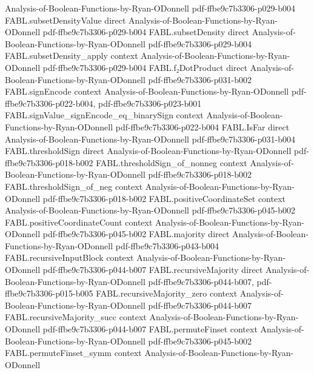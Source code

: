 \begin{theorem}
  {Analysis-of-Boolean-Functions-by-Ryan-ODonnell}
  {pdf-ffbe9c7b3306-p029-b004}
\proofstep
  {FABL.subsetDensityValue}
  {direct}
  {Analysis-of-Boolean-Functions-by-Ryan-ODonnell}
  {pdf-ffbe9c7b3306-p029-b004}
\proofstep
  {FABL.subsetDensity}
  {direct}
  {Analysis-of-Boolean-Functions-by-Ryan-ODonnell}
  {pdf-ffbe9c7b3306-p029-b004}
\proofstep
  {FABL.subsetDensity_apply}
  {context}
  {Analysis-of-Boolean-Functions-by-Ryan-ODonnell}
  {pdf-ffbe9c7b3306-p029-b004}
\proofstep
  {FABL.f₂DotProduct}
  {direct}
  {Analysis-of-Boolean-Functions-by-Ryan-ODonnell}
  {pdf-ffbe9c7b3306-p031-b002}
\proofstep
  {FABL.signEncode}
  {context}
  {Analysis-of-Boolean-Functions-by-Ryan-ODonnell}
  {pdf-ffbe9c7b3306-p022-b004,
    pdf-ffbe9c7b3306-p023-b001}
\proofstep
  {FABL.signValue_signEncode_eq_binarySign}
  {context}
  {Analysis-of-Boolean-Functions-by-Ryan-ODonnell}
  {pdf-ffbe9c7b3306-p022-b004}
\proofstep
  {FABL.IsFar}
  {direct}
  {Analysis-of-Boolean-Functions-by-Ryan-ODonnell}
  {pdf-ffbe9c7b3306-p031-b004}
\proofstep
  {FABL.thresholdSign}
  {direct}
  {Analysis-of-Boolean-Functions-by-Ryan-ODonnell}
  {pdf-ffbe9c7b3306-p018-b002}
\proofstep
  {FABL.thresholdSign_of_nonneg}
  {context}
  {Analysis-of-Boolean-Functions-by-Ryan-ODonnell}
  {pdf-ffbe9c7b3306-p018-b002}
\proofstep
  {FABL.thresholdSign_of_neg}
  {context}
  {Analysis-of-Boolean-Functions-by-Ryan-ODonnell}
  {pdf-ffbe9c7b3306-p018-b002}
\proofstep
  {FABL.positiveCoordinateSet}
  {context}
  {Analysis-of-Boolean-Functions-by-Ryan-ODonnell}
  {pdf-ffbe9c7b3306-p045-b002}
\proofstep
  {FABL.positiveCoordinateCount}
  {context}
  {Analysis-of-Boolean-Functions-by-Ryan-ODonnell}
  {pdf-ffbe9c7b3306-p045-b002}
\proofstep
  {FABL.majority}
  {direct}
  {Analysis-of-Boolean-Functions-by-Ryan-ODonnell}
  {pdf-ffbe9c7b3306-p043-b004}
\proofstep
  {FABL.recursiveInputBlock}
  {context}
  {Analysis-of-Boolean-Functions-by-Ryan-ODonnell}
  {pdf-ffbe9c7b3306-p044-b007}
\proofstep
  {FABL.recursiveMajority}
  {direct}
  {Analysis-of-Boolean-Functions-by-Ryan-ODonnell}
  {pdf-ffbe9c7b3306-p044-b007,
    pdf-ffbe9c7b3306-p015-b005}
\proofstep
  {FABL.recursiveMajority_zero}
  {context}
  {Analysis-of-Boolean-Functions-by-Ryan-ODonnell}
  {pdf-ffbe9c7b3306-p044-b007}
\proofstep
  {FABL.recursiveMajority_succ}
  {context}
  {Analysis-of-Boolean-Functions-by-Ryan-ODonnell}
  {pdf-ffbe9c7b3306-p044-b007}
\proofstep
  {FABL.permuteFinset}
  {context}
  {Analysis-of-Boolean-Functions-by-Ryan-ODonnell}
  {pdf-ffbe9c7b3306-p045-b002}
\proofstep
  {FABL.permuteFinset_symm}
  {context}
  {Analysis-of-Boolean-Functions-by-Ryan-ODonnell}

\end{theorem}

